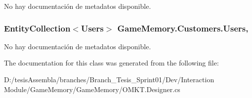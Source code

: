 No hay documentación de metadatos disponible. 

\hypertarget{class_game_memory_1_1_customers_ab53f9e2dc522ccf676bebe8223ccbfdd}{
\subsubsection[{Users}]{\setlength{\rightskip}{0pt plus 5cm}Entity\-Collection$<${\bf Users}$>$ Game\-Memory.\-Customers.\-Users\hspace{0.3cm}{\ttfamily [get]}, {\ttfamily [set]}}}\label{class_game_memory_1_1_customers_ab53f9e2dc522ccf676bebe8223ccbfdd}


No hay documentación de metadatos disponible. 



The documentation for this class was generated from the following file\-:\begin{DoxyCompactItemize}
\item 
D\-:/tesis\-Assembla/branches/\-Branch\-\_\-\-Tesis\-\_\-\-Sprint01/\-Dev/\-Interaction Module/\-Game\-Memory/\-Game\-Memory/O\-M\-K\-T.\-Designer.\-cs\end{DoxyCompactItemize}
